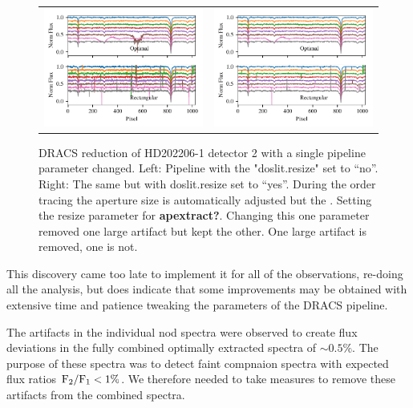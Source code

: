 \begin{figure}
    \centering
    \begin{tabular}{cc}
    \includegraphics[width=0.5\linewidth]{figures/reduction/bp_plots/non_resized_nods_HD202206-1_chip_2} & \includegraphics[width=0.5\linewidth]{figures/reduction/bp_plots/resized_nods_HD202206-1_chip_2}\\
    \end{tabular}
    \caption{DRACS reduction of HD202206-1 detector 2 with a single pipeline parameter changed. Left: Pipeline with the "doslit.resize" set to ``no''. Right: The same but with doslit.resize set to ``yes''. During the order tracing the aperture size is automatically adjusted but the . Setting the resize parameter for \textbf{apextract?}. Changing this one parameter removed one large artifact but kept the other. One large artifact is removed, one is not.}
    \label{fig:resizednods}
\end{figure}

This discovery came too late to implement it for all of the observations, re-doing all the analysis, but does indicate that some improvements may be obtained with extensive time and patience tweaking the parameters of the DRACS pipeline.


The artifacts in the individual nod spectra were observed to create flux deviations in the fully combined optimally extracted spectra of \(\sim 0.5\% \). The purpose of these spectra was to detect faint compnaion spectra with expected flux ratios \(\rm {F_2}/{F_1} < 1\% \). We therefore needed to take measures to remove these artifacts from the combined spectra.

